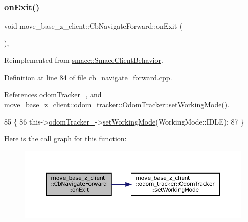 \mbox{\label{classmove__base__z__client_1_1CbNavigateForward_aad7d35b5c46b938cfa64a6f14ecf2337}} 
\subsubsection{\texorpdfstring{on\+Exit()}{onExit()}}
{\footnotesize\ttfamily void move\+\_\+base\+\_\+z\+\_\+client\+::\+Cb\+Navigate\+Forward\+::on\+Exit (\begin{DoxyParamCaption}{ }\end{DoxyParamCaption})\hspace{0.3cm}{\ttfamily [override]}, {\ttfamily [virtual]}}



Reimplemented from \hyperlink{classsmacc_1_1SmaccClientBehavior_ac0cd72d42bd00425362a97c9803ecce5}{smacc\+::\+Smacc\+Client\+Behavior}.



Definition at line 84 of file cb\+\_\+navigate\+\_\+forward.\+cpp.



References odom\+Tracker\+\_\+, and move\+\_\+base\+\_\+z\+\_\+client\+::odom\+\_\+tracker\+::\+Odom\+Tracker\+::set\+Working\+Mode().


\begin{DoxyCode}
85 \{
86     this->\hyperlink{classmove__base__z__client_1_1CbNavigateForward_a1472ca04aac37644667e8833668a5bab}{odomTracker\_}->\hyperlink{classmove__base__z__client_1_1odom__tracker_1_1OdomTracker_aebeb8ff6d1f9375d855def4a33b90731}{setWorkingMode}(WorkingMode::IDLE);
87 \}
\end{DoxyCode}
Here is the call graph for this function\+:
\nopagebreak
\begin{figure}[H]
\begin{center}
\leavevmode
\includegraphics[width=350pt]{classmove__base__z__client_1_1CbNavigateForward_aad7d35b5c46b938cfa64a6f14ecf2337_cgraph}
\end{center}
\end{figure}


